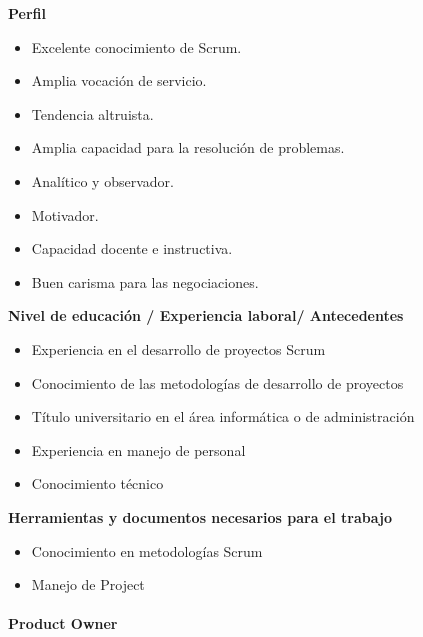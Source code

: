 \begin{itemize}
            \item \textbf{Perfil}
            	\begin{itemize}
                    \item Excelente conocimiento de Scrum.
                    \item Amplia vocación de servicio.
                    \item Tendencia altruista.
                    \item Amplia capacidad para la resolución de problemas.
                    \item Analítico y observador.
                    \item Motivador.
                    \item Capacidad docente e instructiva.
                    \item Buen carisma para las negociaciones.
				\end{itemize}
            {\correccionTexto    
            \item \textbf{Nivel de educación / Experiencia laboral/ Antecedentes}
                \begin{itemize}
                    \item  Experiencia en el desarrollo de proyectos Scrum
					\item Conocimiento de las metodologías de desarrollo de proyectos
					\item Título universitario en el área informática o de administración
					\item Experiencia en manejo de personal
					\item Conocimiento técnico 
                \end{itemize}
            \item \textbf{Herramientas y documentos necesarios para el trabajo}
            	\begin{itemize}
                    \item Conocimiento en metodologías Scrum
                    \item Manejo de Project
                    
                \end{itemize}   
            }
			\end{itemize}
        
        
        \paragraph{Product Owner}
        
